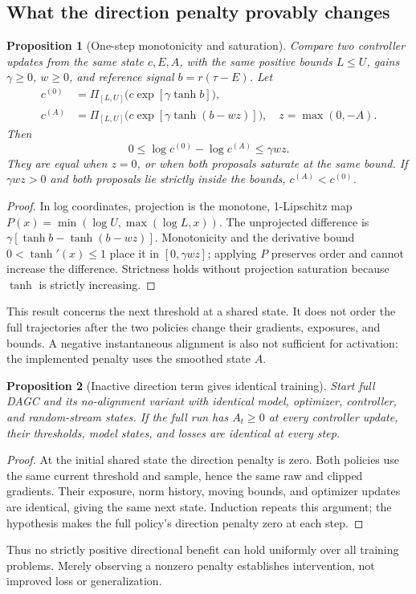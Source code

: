 \documentclass{article}
\newtheorem{proposition}{Proposition}
\begin{document}
\subsection{What the direction penalty provably changes}
\begin{proposition}[One-step monotonicity and saturation]
Compare two controller updates from the same state $c,E,A$, with the same
positive bounds $L\leq U$, gains $\gamma\geq0$, $w\geq0$, and reference
signal $b=r(\tau-E)$. Let
\begin{align}
 c^{(0)}&=\Pi_{[L,U]}\big(c\exp[\gamma\tanh b]\big),\\
 c^{(A)}&=\Pi_{[L,U]}\big(c\exp[\gamma\tanh(b-wz)]\big),\quad
 z=\max(0,-A).
\end{align}
Then
\begin{equation}
 0\leq\log c^{(0)}-\log c^{(A)}\leq\gamma wz.
\end{equation}
They are equal when $z=0$, or when both proposals saturate at the same bound.
If $\gamma wz>0$ and both proposals lie strictly inside the bounds,
$c^{(A)}<c^{(0)}$.
\end{proposition}
\begin{proof}
In log coordinates, projection is the monotone, 1-Lipschitz map
$P(x)=\min(\log U,\max(\log L,x))$. The unprojected difference is
$\gamma[\tanh b-\tanh(b-wz)]$. Monotonicity and the derivative bound
$0<\tanh'(x)\leq1$ place it in $[0,\gamma wz]$; applying $P$ preserves
order and cannot increase the difference. Strictness holds without projection
saturation because $\tanh$ is strictly increasing.
\end{proof}
This result concerns the next threshold at a shared state. It does not order
the full trajectories after the two policies change their gradients, exposures,
and bounds. A negative instantaneous alignment is also not sufficient for
activation: the implemented penalty uses the smoothed state $A$.

\begin{proposition}[Inactive direction term gives identical training]
Start full DAGC and its no-alignment variant with identical model, optimizer,
controller, and random-stream states. If the full run has $A_t\geq0$ at every
controller update, their thresholds, model states, and losses are identical
at every step.
\end{proposition}
\begin{proof}
At the initial shared state the direction penalty is zero. Both policies use
the same current threshold and sample, hence the same raw and clipped
gradients. Their exposure, norm history, moving bounds, and optimizer updates
are identical, giving the same next state. Induction repeats this argument;
the hypothesis makes the full policy's direction penalty zero at each step.
\end{proof}
Thus no strictly positive directional benefit can hold uniformly over all
training problems. Merely observing a nonzero penalty establishes intervention,
not improved loss or generalization.
\end{document}
